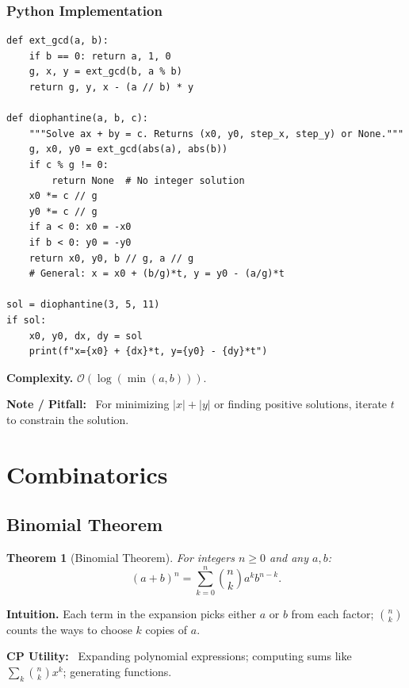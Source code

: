 \documentclass[10pt,a4paper]{article}
\theoremstyle{cpstyle}
\newtheorem{theorem}{Theorem}[section]
\newenvironment{cpnote}{%
  \begin{mdframed}[backgroundcolor=notebg, linecolor=orange!70, linewidth=1pt,
    innerleftmargin=10pt, innerrightmargin=10pt, innertopmargin=6pt, innerbottommargin=6pt]
  \textbf{\color{orange!80!black}Note / Pitfall:}~}{%
  \end{mdframed}}
\newenvironment{cputility}{%
  \begin{mdframed}[backgroundcolor=theorembg, linecolor=accent!50, linewidth=1pt,
    innerleftmargin=10pt, innerrightmargin=10pt, innertopmargin=6pt, innerbottommargin=6pt]
  \textbf{\color{accent}CP Utility:}~}{%
  \end{mdframed}}
\newcommand{\bigO}[1]{\mathcal{O}\!\left(#1\right)}
\begin{document}
\subsubsection{Python Implementation}
\begin{lstlisting}[caption={Linear Diophantine Equation solver}]
def ext_gcd(a, b):
    if b == 0: return a, 1, 0
    g, x, y = ext_gcd(b, a % b)
    return g, y, x - (a // b) * y

def diophantine(a, b, c):
    """Solve ax + by = c. Returns (x0, y0, step_x, step_y) or None."""
    g, x0, y0 = ext_gcd(abs(a), abs(b))
    if c % g != 0:
        return None  # No integer solution
    x0 *= c // g
    y0 *= c // g
    if a < 0: x0 = -x0
    if b < 0: y0 = -y0
    return x0, y0, b // g, a // g
    # General: x = x0 + (b/g)*t, y = y0 - (a/g)*t

sol = diophantine(3, 5, 11)
if sol:
    x0, y0, dx, dy = sol
    print(f"x={x0} + {dx}*t, y={y0} - {dy}*t")
\end{lstlisting}

\textbf{Complexity.} $\bigO{\log(\min(a,b))}$.

\begin{cpnote}
For minimizing $|x|+|y|$ or finding positive solutions, iterate $t$ to constrain the solution.
\end{cpnote}

\clearpage
\section{Combinatorics}

\subsection{Binomial Theorem}

\begin{theorem}[Binomial Theorem]
For integers $n \geq 0$ and any $a, b$:
\[
  (a+b)^n = \sum_{k=0}^{n} \binom{n}{k} a^k b^{n-k}.
\]
\end{theorem}

\textbf{Intuition.} Each term in the expansion picks either $a$ or $b$ from each factor; $\binom{n}{k}$ counts the ways to choose $k$ copies of $a$.

\begin{cputility}
Expanding polynomial expressions; computing sums like $\sum_k \binom{n}{k} x^k$; generating functions.
\end{cputility}
\end{document}

